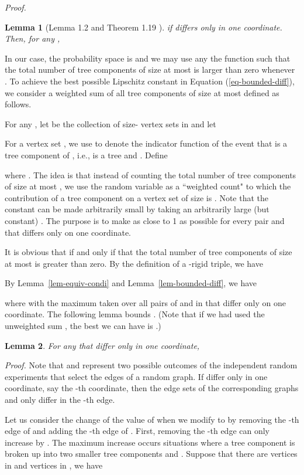 \documentclass[11pt]{article}
\newtheorem{lemma}{Lemma}[section]
\providecommand{\qed}{\hfill }
\newenvironment{proof}[0]{\textit{Proof.} }{\hfill  \qed}
\begin{document}
\begin{proof}
\begin{lemma}[Lemma 1.2 \cite{mcdiarmid89} and Theorem 1.19 \cite{bollobas01}]
if  differs only in one coordinate. Then, for any ,
   
\end{lemma} 

In our case, the probability space is 
and we may use any the function  such that  the total number 
of tree components of size at most  is larger than zero whenever . To achieve  
the best possible Lipschitz constant  in Equation (\ref{eq-bounded-diff}), we consider
a weighted sum  of all tree components of size at most  defined as follows.      

For any ,  let  be the collection of size- vertex sets in  
and let 
 
For a vertex set , we use  to denote the indicator function of the event that   is a tree component of , i.e.,  is a tree and
. Define 
  
where . The idea is that instead of counting the total number of tree components of size at most , we use the random  variable  as  a ``weighted count" 
to which the contribution of a tree component on a vertex set of size  is . Note that the constant  can be made arbitrarily small by taking an arbitrarily large (but constant) . The purpose is to make   
as close to 1 as possible for every pair  and  that differs only on 
one coordinate. 

It is obvious that  if and only if  that the total number of 
tree components of size at most 
is greater than zero. By the definition of a -rigid triple, we have
  
By Lemma~\ref{lem-equiv-condi} and Lemma~\ref{lem-bounded-diff}, we have 

where  with the maximum taken over
all pairs of  and  in   that differ only on one coordinate.
The following lemma bounds . 
(Note that if we had used the unweighted sum , 
the best we can have is  .)
\begin{lemma}
\label{lem-max-diff}
For any  that differ only in one coordinate,  

\end{lemma}
\begin{proof}
Note that  and  represent two possible outcomes of the  independent random experiments that select the  edges of a random graph.   
If  differ only in one coordinate, say the -th coordinate, 
then the edge sets of the corresponding graphs  and  only differ
in the -th edge.   

Let us 
consider the change of the value of  when we modify  to 
by removing the -th edge of  and adding the -th edge of .
First, removing the -th edge can only increase  by . The maximum increase
occurs situations where a tree component  is broken up into two smaller
tree components  and . Suppose that there are  vertices in  and  vertices 
in , we have 


\end{proof}
\end{proof}
\end{document}
